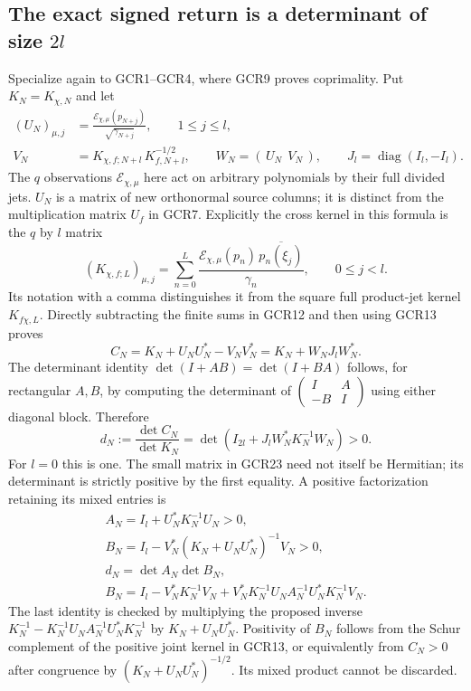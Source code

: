\documentclass[11pt,a4paper]{article}
\begin{document}
\subsection{The exact signed return is a determinant of size $2l$}

Specialize again to GCR1--GCR4, where GCR9 proves coprimality.
Put $K_N=K_{\chi,N}$ and let
\[
\begin{split}
 (U_N)_{\mu,j}
   &=\frac{\mathcal E_{\chi,\mu}(p_{N+j})}
                                  {\sqrt{\gamma_{N+j}}},
                    \qquad 1\leq j\leq l,\\
 V_N&=K_{\chi,f;N+l}\,K_{f,N+l}^{-1/2},\qquad
 W_N=(\,U_N\ \ V_N\,),\qquad
 J_l=\operatorname{diag}(I_l,-I_l).
\end{split}\tag{GCR21}
\]
The $q$ observations $\mathcal E_{\chi,\mu}$ here act on arbitrary
polynomials by their full divided jets. $U_N$ is a matrix of
new orthonormal source columns; it is distinct from the
multiplication matrix $U_f$ in GCR7. Explicitly the cross kernel
in this formula is the $q$ by $l$ matrix
\[
 (K_{\chi,f;L})_{\mu,j}
    =\sum_{n=0}^L
       \frac{\mathcal E_{\chi,\mu}(p_n)\,
                         \overline{p_n(\xi_j)}}{\gamma_n},
       \qquad 0\leq j<l.
\]
Its notation with a comma distinguishes it from the square
full product-jet kernel $K_{f\chi,L}$. Directly subtracting the
finite sums in GCR12 and then using GCR13 proves
\[
 C_N=K_N+U_NU_N^*-V_NV_N^*
        =K_N+W_NJ_lW_N^*.
\tag{GCR22}
\]
The determinant identity $\det(I+AB)=\det(I+BA)$ follows, for
rectangular $A,B$, by computing the determinant of
$\left(\begin{smallmatrix}I&A\\-B&I\end{smallmatrix}\right)$
using either diagonal block. Therefore
\[
 d_N:=\frac{\det C_N}{\det K_N}
       =\det\!\left(I_{2l}+J_lW_N^*K_N^{-1}W_N\right)>0.
\tag{GCR23}
\]
For $l=0$ this is one. The small matrix in GCR23 need not itself
be Hermitian; its determinant is strictly positive by the
first equality. A positive factorization retaining its mixed
entries is
\[
\begin{gathered}
 A_N=I_l+U_N^*K_N^{-1}U_N>0,\\
 B_N=I_l-V_N^*(K_N+U_NU_N^*)^{-1}V_N>0,\\
 d_N=\det A_N\det B_N,\\
 B_N=I_l-V_N^*K_N^{-1}V_N
       +V_N^*K_N^{-1}U_N A_N^{-1}U_N^*K_N^{-1}V_N .
\end{gathered}\tag{GCR24}
\]
The last identity is checked by multiplying the proposed inverse
$K_N^{-1}-K_N^{-1}U_N A_N^{-1}U_N^*K_N^{-1}$
by $K_N+U_NU_N^*$. Positivity of $B_N$ follows from the
Schur complement of the positive joint kernel in GCR13,
or equivalently from $C_N>0$ after congruence by
$(K_N+U_NU_N^*)^{-1/2}$. Its mixed product cannot be discarded.
\end{document}
